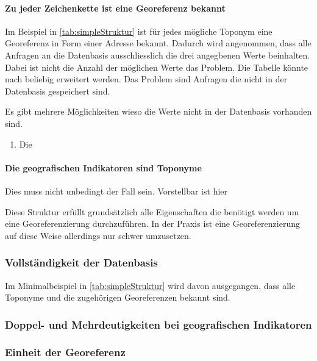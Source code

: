 			\paragraph{Zu jeder Zeichenkette ist eine Georeferenz bekannt}

				Im Beispiel in \ref{tab:simpleStruktur} ist für jedes mögliche Toponym eine Georeferenz in Form einer Adresse bekannt.
				Dadurch wird angenommen, dass alle Anfragen an die Datenbasis ausschliesslich die drei angegbenen Werte beinhalten. 
				Dabei ist nicht die Anzahl der möglichen Werte das Problem.
				Die Tabelle könnte nach beliebig erweitert werden.
				Das Problem sind Anfragen die nicht in der Datenbasis gespeichert sind.

				Es gibt mehrere Möglichkeiten wieso die Werte nicht in der Datenbasis vorhanden sind. 

				\begin{enumerate}
				 	\item Die  
				 \end{enumerate} 



			\paragraph{Die geografischen Indikatoren sind Toponyme}

				Dies muss nicht unbedingt der Fall sein. 
				Vorstellbar ist hier 

			Diese Struktur erfüllt grundsätzlich alle Eigenschaften die benötigt werden um eine Georeferenzierung durchzuführen. 
			In der Praxis ist eine Georeferenzierung auf diese Weise allerdings nur schwer umzusetzen.

			\subsubsection{Vollständigkeit der Datenbasis} 

				Im Minimalbeispiel in \ref{tab:simpleStruktur} wird davon ausgegangen, dass alle Toponyme und die zugehörigen Georeferenzen bekannt sind.		

			\subsubsection{Doppel- und Mehrdeutigkeiten bei geografischen Indikatoren} 



			\subsubsection{Einheit der Georeferenz} 


